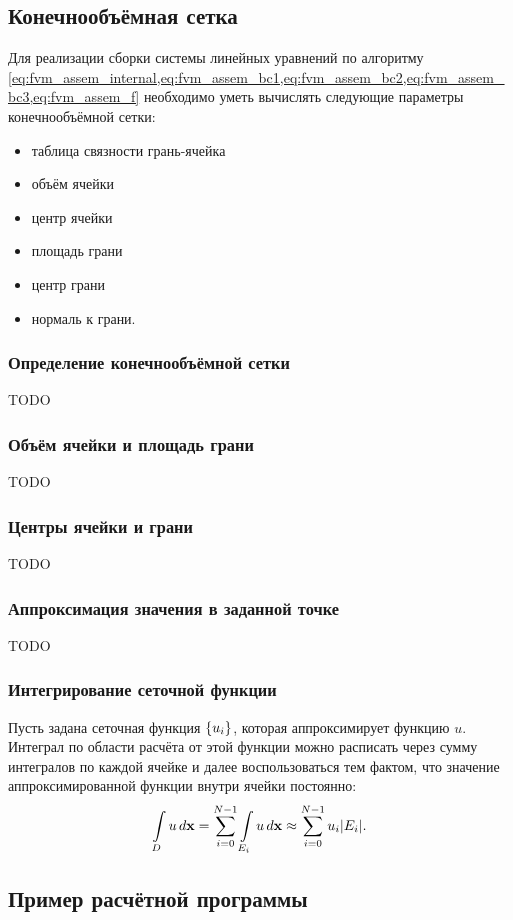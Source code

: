 \subsection{Конечнообъёмная сетка}
\label{sec:fvm-grid-algos}
Для реализации сборки системы линейных уравнений по 
алгоритму \cref{eq:fvm_assem_internal,eq:fvm_assem_bc1,eq:fvm_assem_bc2,eq:fvm_assem_bc3,eq:fvm_assem_f}
необходимо уметь вычислять следующие параметры конечнообъёмной сетки:
\begin{itemize}
\item
таблица связности грань-ячейка
\item
объём ячейки
\item
центр ячейки
\item
площадь грани
\item
центр грани
\item
нормаль к грани.
\end{itemize}

\subsubsection{Определение конечнообъёмной сетки}
TODO
\subsubsection{Объём ячейки и площадь грани}
TODO
\subsubsection{Центры ячейки и грани}
TODO
\subsubsection{Аппроксимация значения в заданной точке}
TODO
\subsubsection{Интегрирование сеточной функции}
Пусть задана сеточная функция $\left\{u_i\right\}$, которая аппроксимирует функцию $u$.
Интеграл по области расчёта от этой функции можно расписать через сумму интегралов
по каждой ячейке и далее воспользоваться тем фактом,
что значение аппроксимированной функции внутри ячейки постоянно:
\begin{equation}
\label{eq:fvm_integrate}
\arint{u}{D}{\vec x} = \sum_{i=0}^{N-1} \arint{u}{E_i}{\vec x} \approx \sum_{i=0}^{N-1} u_i |E_i|.
\end{equation}


\subsection{Пример расчётной программы}
\label{sec:prog-poisson2-fvm}

